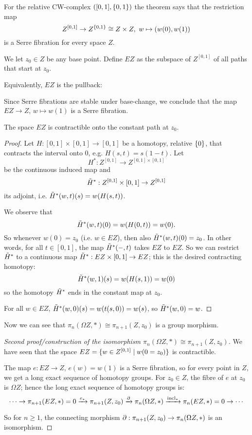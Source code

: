 For the relative CW-complex $([0,1],\{0,1\})$ the theorem says that the restriction map
\[Z^{[0,1]}\to Z^{\{0,1\}}\cong Z\times Z,\ w\mapsto (w(0),w(1))\]
is a Serre fibration for every space $Z$.

We let $z_0\in Z$ be any base point. Define $EZ$ as the subspace of $Z^{[0,1]}$ of all paths that start at $z_0$.

Equivalently, $EZ$ is the pullback:
\begin{center}
\end{center}

Since Serre fibrations are stable under base-change, we conclude that the map $EZ\to Z$, $w\mapsto w(1)$ is a Serre fibration.

\begin{theorem}\label{theorem:EZ-contractible}
The space $EZ$ is contractible onto the constant path at $z_0$.
\end{theorem}

\begin{proof}
Let $H:[0,1]\times[0,1]\to[0,1]$ be a homotopy, relative $\{0\}$, that contracts the interval onto $0$, e.g. $H(s,t)=s(1-t)$. Let
\[H^*:Z^{[0,1]}\to Z^{[0,1]\times[0,1]}\]
be the continuous induced map and
\[\tilde H^*:Z^{[0,1]}\times[0,1]\to Z^{[0,1]}\]
its adjoint, i.e. $\tilde H^*(w,t)(s)=w(H(s,t))$.

We observe that
\[\tilde H^*(w,t)(0)=w(H(0,t))=w(0).\]
So whenever $w(0)=z_0$ (i.e. $w\in EZ$), then also $\tilde H^*(w,t)(0)=z_0$. In other words, for all $t\in[0,1]$, the map $\tilde H^*(-,t)$ takes $EZ$ to $EZ$. So we can restrict $\tilde H^*$ to a continuous map $\tilde H^*:EZ\times[0,1]\to EZ$; this is the desired contracting homotopy:
\[\tilde H^*(w,1)(s)=w(H(s,1))=w(0)\]
so the homotopy $\tilde H^*$ ends in the constant map at $z_0$.

For all $w\in EZ$, $\tilde H^*(w,0)(s)=w(t(s,0))=w(s)$, so $\tilde H^*(w,0)=w$.
\end{proof}

Now we can see that $\pi_n(\Omega Z,*)\cong\pi_{n+1}(Z,z_0)$ is a group morphism.

\begin{proof}[Second proof/construction of the isomorphism $\pi_n(\Omega Z,*)\cong\pi_{n+1}(Z,z_0)$]

We have seen that the space $EZ=\{w\in Z^{[0,1]}\mid w(0=z_0)\}$ is contractible.

The map $e:EZ\to Z$, $e(w)=w(1)$ is a Serre fibration, so for every point in $Z$, we get a long exact sequence of homotopy groups. For $z_0\in Z$, the fibre of $e$ at $z_0$ is $\Omega Z$; hence the long exact sequence of homotopy groups is:
\[\dots\to\pi_{n+1}(EZ,*)=0\xrightarrow{e_*}\pi_{n+1}(Z,z_0)\xrightarrow{\partial}\pi_n(\Omega Z,*)\xrightarrow{\operatorname{incl}_*}\pi_n(EZ,*)=0\to\cdots\]

So for $n\geq 1$, the connecting morphism $\partial:\pi_{n+1}(Z,z_0)\to\pi_n(\Omega Z,*)$ is an isomorphism.
\end{proof}

